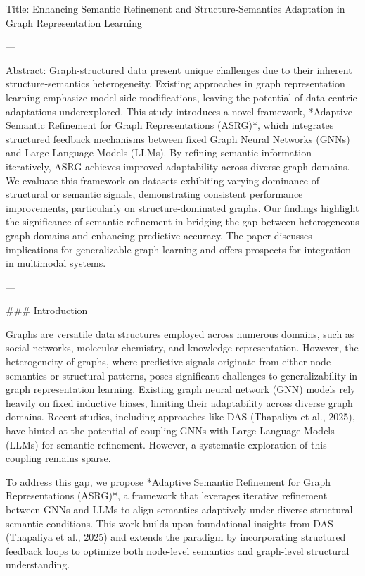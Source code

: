 Title: Enhancing Semantic Refinement and Structure-Semantics Adaptation in Graph Representation Learning

---

Abstract:  
Graph-structured data present unique challenges due to their inherent structure-semantics heterogeneity. Existing approaches in graph representation learning emphasize model-side modifications, leaving the potential of data-centric adaptations underexplored. This study introduces a novel framework, *Adaptive Semantic Refinement for Graph Representations (ASRG)*, which integrates structured feedback mechanisms between fixed Graph Neural Networks (GNNs) and Large Language Models (LLMs). By refining semantic information iteratively, ASRG achieves improved adaptability across diverse graph domains. We evaluate this framework on datasets exhibiting varying dominance of structural or semantic signals, demonstrating consistent performance improvements, particularly on structure-dominated graphs. Our findings highlight the significance of semantic refinement in bridging the gap between heterogeneous graph domains and enhancing predictive accuracy. The paper discusses implications for generalizable graph learning and offers prospects for integration in multimodal systems.

---

### Introduction  

Graphs are versatile data structures employed across numerous domains, such as social networks, molecular chemistry, and knowledge representation. However, the heterogeneity of graphs, where predictive signals originate from either node semantics or structural patterns, poses significant challenges to generalizability in graph representation learning. Existing graph neural network (GNN) models rely heavily on fixed inductive biases, limiting their adaptability across diverse graph domains. Recent studies, including approaches like DAS (Thapaliya et al., 2025), have hinted at the potential of coupling GNNs with Large Language Models (LLMs) for semantic refinement. However, a systematic exploration of this coupling remains sparse.  

To address this gap, we propose *Adaptive Semantic Refinement for Graph Representations (ASRG)*, a framework that leverages iterative refinement between GNNs and LLMs to align semantics adaptively under diverse structural-semantic conditions. This work builds upon foundational insights from DAS (Thapaliya et al., 2025) and extends the paradigm by incorporating structured feedback loops to optimize both node-level semantics and graph-level structural understanding.  

